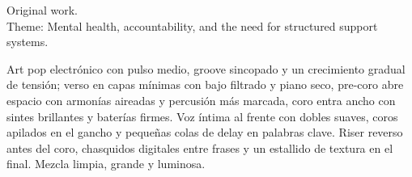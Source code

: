 

\begin{notes}
Original work.\\
Theme: Mental health, accountability, and the need for structured support systems.
\end{notes}

\begin{style}
Art pop electrónico con pulso medio, groove sincopado y un crecimiento gradual de tensión; verso en capas mínimas con bajo filtrado y piano seco, pre-coro abre espacio con armonías aireadas y percusión más marcada, coro entra ancho con sintes brillantes y baterías firmes. %
Voz íntima al frente con dobles suaves, coros apilados en el gancho y pequeñas colas de delay en palabras clave. %
Riser reverso antes del coro, chasquidos digitales entre frases y un estallido de textura en el final. %
Mezcla limpia, grande y luminosa.
\end{style}

